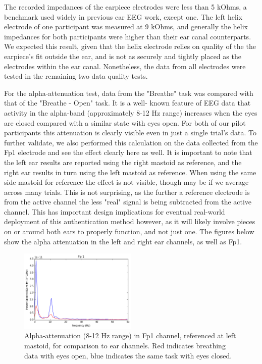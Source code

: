 \documentclass[11pt]{article}
\begin{document}
The recorded impedances of the earpiece electrodes were less than 5 kOhms, a benchmark used widely in previous
ear EEG work, except one. The left helix electrode of one participant was measured at 9 kOhms, and generally the 
helix impedances for both participants were higher than their ear canal counterparts. We expected this result, given that the
helix electrode relies on quality of the the earpiece's fit outside the ear, and is not as securely and tightly placed as the
electrodes within the ear canal. Nonetheless, the data from all electrodes were tested in the remaining two data quality tests.

For the alpha-attenuation test, data from the "Breathe" task was compared with that of the "Breathe - Open" task. It is a well-
known feature of EEG data that activity in the alpha-band (approximately 8-12 Hz range) increases when the eyes are closed
compared with a similar state with eyes open. For both of our pilot participants this attenuation is clearly visible even in just
a single trial's data. To further validate, we also performed this calculation on the data collected from the Fp1 electrode and see
the effect clearly here as well. It is important to note that the left ear results are reported using the right mastoid as reference, and
the right ear results in turn using the left mastoid as reference. When using the same side mastoid for reference the effect is not 
visible, though may be if we average across many trials. This is not surprising, as the further a reference electrode is from the active
channel the less "real" signal is being subtracted from the active channel. This has important design implications for eventual 
real-world deployment of this authentication method however, as it will likely involve pieces on or around both ears to properly 
function, and not just one. The figures below show the alpha attenuation in the left and right ear channels, as well as Fp1.

\begin{figure}[h]
\centering
\includegraphics[width=0.5\textwidth]{001_AlphaAtt_Fp1.jpg}
\caption{Alpha-attenuation (8-12 Hz range) in Fp1 channel, referenced at left mastoid, for comparison to ear channels. Red indicates breathing data with
eyes open, blue indicates the same task with eyes closed.}
\end{figure}
\end{document}
